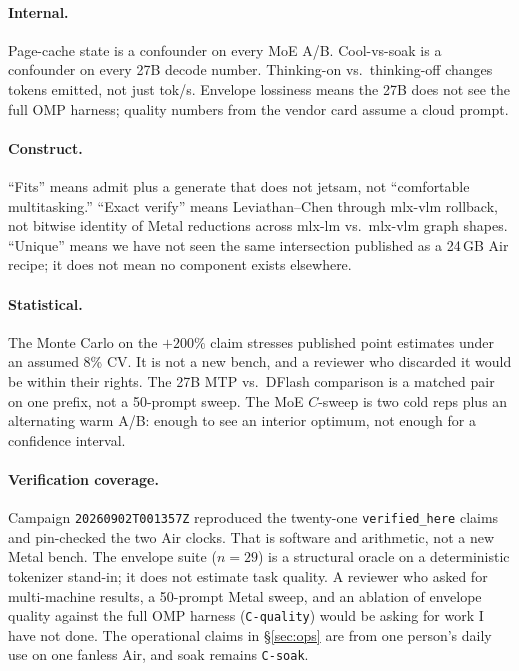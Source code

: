 \paragraph{Internal.} Page-cache state is a confounder on every MoE A/B. Cool-vs-soak is a confounder on every 27B decode number. Thinking-on vs.\ thinking-off changes tokens emitted, not just tok/s. Envelope lossiness means the 27B does not see the full OMP harness; quality numbers from the vendor card assume a cloud prompt.

\paragraph{Construct.} ``Fits'' means admit plus a generate that does not jetsam, not ``comfortable multitasking.'' ``Exact verify'' means Leviathan--Chen through mlx-vlm rollback, not bitwise identity of Metal reductions across mlx-lm vs.\ mlx-vlm graph shapes. ``Unique'' means we have not seen the same intersection published as a 24\,GB Air recipe; it does not mean no component exists elsewhere.

\paragraph{Statistical.} The Monte Carlo on the ${+}200\%$ claim stresses published point estimates under an assumed 8\% CV. It is not a new bench, and a reviewer who discarded it would be within their rights. The 27B MTP vs.\ DFlash comparison is a matched pair on one prefix, not a 50-prompt sweep. The MoE $C$-sweep is two cold reps plus an alternating warm A/B: enough to see an interior optimum, not enough for a confidence interval.

\paragraph{Verification coverage.} Campaign \texttt{20260902T001357Z} reproduced the twenty-one \texttt{verified\_here} claims and pin-checked the two Air clocks. That is software and arithmetic, not a new Metal bench. The envelope suite ($n{=}29$) is a structural oracle on a deterministic tokenizer stand-in; it does not estimate task quality. A reviewer who asked for multi-machine results, a 50-prompt Metal sweep, and an ablation of envelope quality against the full OMP harness (\texttt{C-quality}) would be asking for work I have not done. The operational claims in \S\ref{sec:ops} are from one person's daily use on one fanless Air, and soak remains \texttt{C-soak}.

